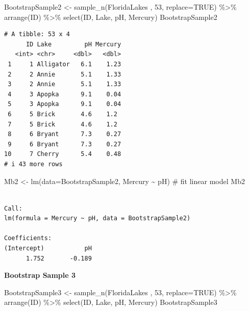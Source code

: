 \documentclass[
  letterpaper,
  DIV=11,
  numbers=noendperiod]{scrreprt}
\newenvironment{Shaded}{\begin{snugshade}}{\end{snugshade}}
\newcommand{\AttributeTok}[1]{\textcolor[rgb]{0.40,0.45,0.13}{#1}}
\newcommand{\CommentTok}[1]{\textcolor[rgb]{0.37,0.37,0.37}{#1}}
\newcommand{\ConstantTok}[1]{\textcolor[rgb]{0.56,0.35,0.01}{#1}}
\newcommand{\DecValTok}[1]{\textcolor[rgb]{0.68,0.00,0.00}{#1}}
\newcommand{\FunctionTok}[1]{\textcolor[rgb]{0.28,0.35,0.67}{#1}}
\newcommand{\NormalTok}[1]{\textcolor[rgb]{0.00,0.23,0.31}{#1}}
\newcommand{\OtherTok}[1]{\textcolor[rgb]{0.00,0.23,0.31}{#1}}
\newcommand{\SpecialCharTok}[1]{\textcolor[rgb]{0.37,0.37,0.37}{#1}}
\begin{document}
\begin{Shaded}
\begin{Highlighting}[]
\NormalTok{BootstrapSample2 }\OtherTok{\textless{}{-}} \FunctionTok{sample\_n}\NormalTok{(FloridaLakes , }\DecValTok{53}\NormalTok{, }\AttributeTok{replace=}\ConstantTok{TRUE}\NormalTok{)  }\SpecialCharTok{\%\textgreater{}\%} \FunctionTok{arrange}\NormalTok{(ID) }\SpecialCharTok{\%\textgreater{}\%} 
  \FunctionTok{select}\NormalTok{(ID, Lake, pH, Mercury)}
\NormalTok{BootstrapSample2}
\end{Highlighting}
\end{Shaded}

\begin{verbatim}
# A tibble: 53 x 4
      ID Lake         pH Mercury
   <int> <chr>     <dbl>   <dbl>
 1     1 Alligator   6.1    1.23
 2     2 Annie       5.1    1.33
 3     2 Annie       5.1    1.33
 4     3 Apopka      9.1    0.04
 5     3 Apopka      9.1    0.04
 6     5 Brick       4.6    1.2 
 7     5 Brick       4.6    1.2 
 8     6 Bryant      7.3    0.27
 9     6 Bryant      7.3    0.27
10     7 Cherry      5.4    0.48
# i 43 more rows
\end{verbatim}

\begin{Shaded}
\begin{Highlighting}[]
\NormalTok{Mb2 }\OtherTok{\textless{}{-}} \FunctionTok{lm}\NormalTok{(}\AttributeTok{data=}\NormalTok{BootstrapSample2, Mercury }\SpecialCharTok{\textasciitilde{}}\NormalTok{ pH) }\CommentTok{\# fit linear model}
\NormalTok{Mb2}
\end{Highlighting}
\end{Shaded}

\begin{verbatim}

Call:
lm(formula = Mercury ~ pH, data = BootstrapSample2)

Coefficients:
(Intercept)           pH  
      1.752       -0.189  
\end{verbatim}

\textbf{Bootstrap Sample 3}

\begin{Shaded}
\begin{Highlighting}[]
\NormalTok{BootstrapSample3 }\OtherTok{\textless{}{-}} \FunctionTok{sample\_n}\NormalTok{(FloridaLakes , }\DecValTok{53}\NormalTok{, }\AttributeTok{replace=}\ConstantTok{TRUE}\NormalTok{)  }\SpecialCharTok{\%\textgreater{}\%} \FunctionTok{arrange}\NormalTok{(ID) }\SpecialCharTok{\%\textgreater{}\%} 
  \FunctionTok{select}\NormalTok{(ID, Lake, pH, Mercury)}
\NormalTok{BootstrapSample3}
\end{Highlighting}
\end{Shaded}
\end{document}
